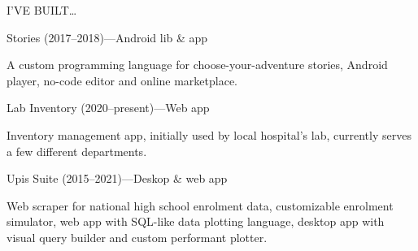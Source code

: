 \begin{minipage}[t]{\linewidth}
{\titleFont\light I'VE BUILT\ldots}\newline

\vspace{\titleBottomMargin}
{\rSubtitleFont\bold Stories \medium(2017--2018)---Android lib \& app \href{https://github.com/luka-j/stories}{\faGithub} \href{https://github.com/luka-j/StoriesApp}{\faGithub}}\newline
\vspace{\ribbonTopMargin}
\ribbonJava \ribbonAndroid \ribbonPlay \ribbonPostgres\newline

{\contentFont A custom programming language for choose-your-adventure stories, Android player, no-code editor and online marketplace.}
\end{minipage}\newline%
%
\begin{minipage}[t]{\linewidth}\vspace{\subsectionSpace}
{\rSubtitleFont\bold Lab Inventory \medium(2020--present)---Web app \href{https://github.com/luka-j/laboratorija-inventar}{\faGithub}}\newline
\vspace{\ribbonTopMargin}
\ribbonKotlin \ribbonSpringBoot \ribbonPostgres \ribbonThymeleaf \newline

{\contentFont Inventory management app, initially used by local hospital's lab, currently serves a few different departments.}
\end{minipage}\newline%
%
\begin{minipage}[t]{\linewidth}\vspace{\subsectionSpace}
{\rSubtitleFont\bold Upis Suite \medium(2015--2021)---Deskop \& web app \href{https://github.com/luka-j/UpisScraper}{\faGithub} \href{https://github.com/luka-j/UpisStats}{\faGithub} \href{https://github.com/luka-j/UpisDesktop}{\faGithub}}\newline
\vspace{\ribbonTopMargin}
\ribbonJava \ribbonPlay \ribbonSwing \ribbonPostgres \ribbonJavascript\newline

{\contentFont Web scraper for national high school enrolment data, customizable enrolment simulator, web app with SQL-like data plotting language, desktop app with visual query builder and custom performant plotter.}
\end{minipage}\newline%
